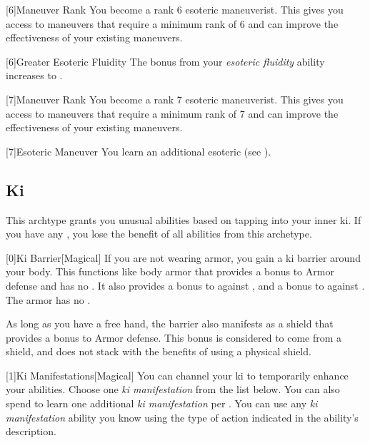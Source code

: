        {
            [6]{Maneuver Rank} You become a rank 6 esoteric maneuverist.
            This gives you access to maneuvers that require a minimum rank of 6 and can improve the effectiveness of your existing maneuvers.

            [6]{Greater Esoteric Fluidity} The bonus from your \textit{esoteric fluidity} ability increases to .
        }

        {
            [7]{Maneuver Rank} You become a rank 7 esoteric maneuverist.
            This gives you access to maneuvers that require a minimum rank of 7 and can improve the effectiveness of your existing maneuvers.

            [7]{Esoteric Maneuver}
            You learn an additional esoteric  (see ).
        }

    \newpage
    \subsection{Ki}
        This archtype grants you unusual abilities based on tapping into your inner ki.
        If you have any , you lose the benefit of all abilities from this archetype.

        [0]{Ki Barrier}[Magical]
        If you are not wearing armor, you gain a ki barrier around your body.
        This functions like body armor that provides a  bonus to Armor defense and has no .
        It also provides a  bonus to  against , and a  bonus to  against .
        The armor has no .

        As long as you have a free hand, the barrier also manifests as a shield that provides a  bonus to Armor defense.
        This bonus is considered to come from a shield, and does not stack with the benefits of using a physical shield.

        [1]{Ki Manifestations}[Magical]
        You can channel your ki to temporarily enhance your abilities.
        Choose one \textit{ki manifestation} from the list below.
        You can also spend  to learn one additional \textit{ki manifestation} per .
        You can use any \textit{ki manifestation} ability you know using the type of action indicated in the ability's description.

